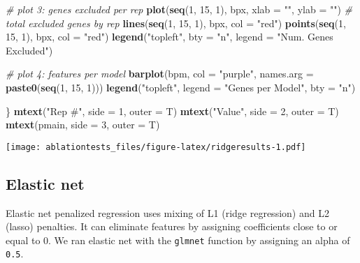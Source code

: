 \documentclass[]{article}
\newenvironment{Shaded}{\begin{snugshade}}{\end{snugshade}}
\newcommand{\CommentTok}[1]{\textcolor[rgb]{0.56,0.35,0.01}{\textit{#1}}}
\newcommand{\DataTypeTok}[1]{\textcolor[rgb]{0.13,0.29,0.53}{#1}}
\newcommand{\DecValTok}[1]{\textcolor[rgb]{0.00,0.00,0.81}{#1}}
\newcommand{\KeywordTok}[1]{\textcolor[rgb]{0.13,0.29,0.53}{\textbf{#1}}}
\newcommand{\NormalTok}[1]{#1}
\newcommand{\StringTok}[1]{\textcolor[rgb]{0.31,0.60,0.02}{#1}}
\begin{document}
\begin{Shaded}
\begin{Highlighting}[]
\CommentTok{# plot 3: genes excluded per rep}
\KeywordTok{plot}\NormalTok{(}\KeywordTok{seq}\NormalTok{(}\DecValTok{1}\NormalTok{, }\DecValTok{15}\NormalTok{, }\DecValTok{1}\NormalTok{), bpx, }\DataTypeTok{xlab =} \StringTok{""}\NormalTok{, }\DataTypeTok{ylab =} \StringTok{""}\NormalTok{) }\CommentTok{# total excluded genes by rep}
\KeywordTok{lines}\NormalTok{(}\KeywordTok{seq}\NormalTok{(}\DecValTok{1}\NormalTok{, }\DecValTok{15}\NormalTok{, }\DecValTok{1}\NormalTok{), bpx, }\DataTypeTok{col =} \StringTok{"red"}\NormalTok{)}
\KeywordTok{points}\NormalTok{(}\KeywordTok{seq}\NormalTok{(}\DecValTok{1}\NormalTok{, }\DecValTok{15}\NormalTok{, }\DecValTok{1}\NormalTok{), bpx, }\DataTypeTok{col =} \StringTok{"red"}\NormalTok{)}
\KeywordTok{legend}\NormalTok{(}\StringTok{"topleft"}\NormalTok{, }\DataTypeTok{bty =} \StringTok{"n"}\NormalTok{, }\DataTypeTok{legend =} \StringTok{"Num. Genes Excluded"}\NormalTok{)}

\CommentTok{# plot 4: features per model}
\KeywordTok{barplot}\NormalTok{(bpm, }\DataTypeTok{col =} \StringTok{"purple"}\NormalTok{, }\DataTypeTok{names.arg =} \KeywordTok{paste0}\NormalTok{(}\KeywordTok{seq}\NormalTok{(}\DecValTok{1}\NormalTok{, }\DecValTok{15}\NormalTok{, }\DecValTok{1}\NormalTok{)))}
\KeywordTok{legend}\NormalTok{(}\StringTok{"topleft"}\NormalTok{, }\DataTypeTok{legend =} \StringTok{"Genes per Model"}\NormalTok{, }\DataTypeTok{bty =} \StringTok{"n"}\NormalTok{)}

\NormalTok{\}}
\KeywordTok{mtext}\NormalTok{(}\StringTok{"Rep #"}\NormalTok{, }\DataTypeTok{side =} \DecValTok{1}\NormalTok{, }\DataTypeTok{outer =}\NormalTok{ T)}
\KeywordTok{mtext}\NormalTok{(}\StringTok{"Value"}\NormalTok{, }\DataTypeTok{side =} \DecValTok{2}\NormalTok{, }\DataTypeTok{outer =}\NormalTok{ T)}
\KeywordTok{mtext}\NormalTok{(pmain, }\DataTypeTok{side =} \DecValTok{3}\NormalTok{, }\DataTypeTok{outer =}\NormalTok{ T)}
\end{Highlighting}
\end{Shaded}

\texttt{[image: ablationtests\_files/figure-latex/ridgeresults-1.pdf]}

\hypertarget{elastic-net}{%
\subsection{Elastic net}\label{elastic-net}}

Elastic net penalized regression uses mixing of L1 (ridge regression)
and L2 (lasso) penalties. It can eliminate features by assigning
coefficients close to or equal to 0. We ran elastic net with the
\texttt{glmnet} function by assigning an alpha of \texttt{0.5}.
\end{document}
